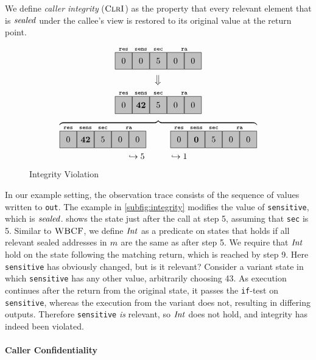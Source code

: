 \documentclass[10pt,conference]{ieeetran}%
\theoremstyle{definition}
\begin{document}
We define \emph{caller integrity} (\(\textnormal{\sc ClrI}\))  as the property that
every relevant element that is \(\mathit{sealed}\) under the callee's view is restored
to its original value at the return point.

\begin{figure}
  \centering
  \[
  \stackrel{\texttt{res}}{\numbox[0]}
  \stackrel{\texttt{sens}}{\numbox[0]}
  \stackrel{\texttt{sec}}{\numbox[5]}
  \stackrel{\texttt{ra}}{\numbox[0]\numbox[0]}\]
  \[\big\Downarrow\]
  \[
  \stackrel{\texttt{res}}{\numbox[0]}
  \stackrel{\texttt{sens}}{\numbox[\bf 42]}
  \stackrel{\texttt{sec}}{\numbox[5]}
  \stackrel{\texttt{ra}}{\numbox[0]\numbox[0]}\]
  \[\overbrace{
    \stackrel{\texttt{res}}{\numbox[0]}
    \stackrel{\texttt{sens}}{\numbox[\bf 42]}
    \stackrel{\texttt{sec}}{\numbox[5]}
    \stackrel{\texttt{ra}}{\numbox[0]\numbox[0]}
    \hspace{1cm}
    \stackrel{\texttt{res}}{\numbox[0]}
    \stackrel{\texttt{sens}}{\numbox[\bf 0]}
    \stackrel{\texttt{sec}}{\numbox[5]}
    \stackrel{\texttt{ra}}{\numbox[0]\numbox[0]}}\]
  \[\large\hookrightarrow 5 \hspace{1cm} \large\hookrightarrow 1\]
  
  \caption{Integrity Violation}
  \label{fig:variant}
\end{figure}

In our example setting, the observation trace consists of the sequence
of values written to {\tt out}.
The example in \cref{subfig:integrity} modifies the value of {\tt sensitive},
which is \(\mathit{sealed}\).  shows the state just after the call at step 5,
assuming that {\tt sec} is 5. Similar to \(\textnormal{\sc WBCF}\), we define
\(\mathit{Int}\) as a predicate on states that holds if
all relevant sealed addresses in \(m\) are the same as after step 5.
We require that \(\mathit{Int}\) hold on the state following the matching return,
which is reached by step 9. Here {\tt sensitive} has obviously changed, but is it relevant?
Consider a variant state in which {\tt sensitive} has any other value, arbitrarily
choosing 43. As execution continues after the return
from the original state, it passes the {\tt if}-test on {\tt sensitive}, whereas the execution
from the variant does not, resulting in differing outputs. Therefore {\tt sensitive} \emph{is} relevant,
so \(\mathit{Int}\) does not hold, and integrity has indeed been violated.

\paragraph*{Caller Confidentiality}
\end{document}
